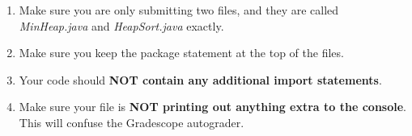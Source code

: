 \documentclass[paper=a4, fontsize=11pt, parskip=full]{scrartcl} %
\numberwithin{equation}{section} %
\numberwithin{figure}{section} %
\numberwithin{table}{section} %
\begin{document}
\begin{enumerate}
  \item Make sure you are only submitting two files, and they are called \emph{MinHeap.java} and \emph{HeapSort.java} exactly.
  \item Make sure you keep the package statement at the top of the files.
  \item Your code should \textbf{NOT contain any additional import statements}.
  \item Make sure your file is \textbf{NOT printing out anything extra to the console}. This will confuse the Gradescope autograder.
\end{enumerate}




\end{document}
